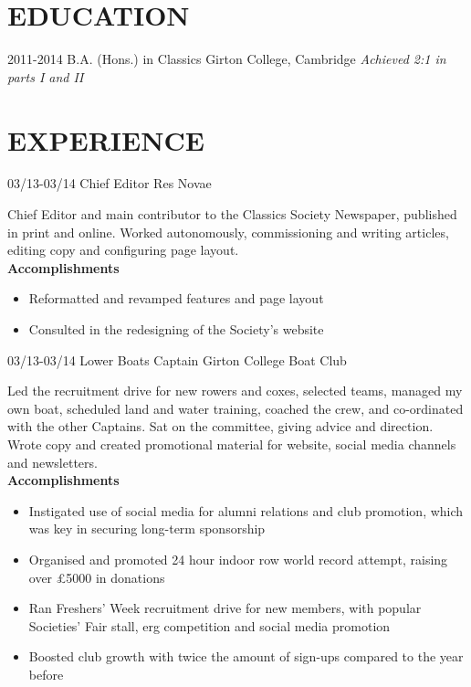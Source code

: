 \documentclass[]{friggeri-cv}
\begin{document}
\section{EDUCATION}

\begin{entrylist}
  \entry
    {2011-2014}
    {B.A. (Hons.) in Classics}
    {Girton College, Cambridge}
    {\emph{Achieved 2:1 in parts I and II}}
\end{entrylist}

\section{EXPERIENCE}

\begin{entrylist}
  \entry
    {03/13-03/14}
    {Chief Editor}
    {Res Novae}
    {Chief Editor and main contributor to the Classics Society Newspaper, published in print and online. Worked autonomously, commissioning and writing articles, editing copy and configuring page layout. \\
    \textbf{Accomplishments}
    \begin{itemize}
    	\item Reformatted and revamped features and page layout
    	\item Consulted in the redesigning of the Society's website
    \end{itemize}
    }
  \entry
  {03/13-03/14}
  {Lower Boats Captain}
  {Girton College Boat Club}
  {Led the recruitment drive for new rowers and coxes, selected teams, managed my own boat, scheduled land and water training, coached the crew, and co-ordinated with the other Captains. Sat on the committee, giving advice and direction. Wrote copy and created promotional material for website, social media channels and newsletters. \\
  	\textbf{Accomplishments}
  	\begin{itemize}
  		\item Instigated use of social media for alumni relations and club promotion, which was key in securing long-term sponsorship
  		\item Organised and promoted 24 hour indoor row world record attempt, raising over £5000 in donations
  		\item Ran Freshers' Week recruitment drive for new members, with popular Societies' Fair stall, erg competition and social media promotion
  		\item Boosted club growth with twice the amount of sign-ups compared to the year before
  	\end{itemize}
  }
\end{entrylist}
\end{document}
